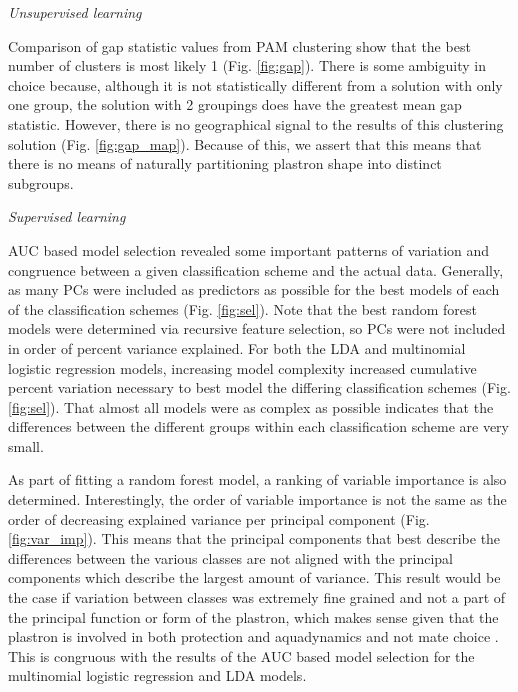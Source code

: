 \documentclass[12pt,letterpaper]{article}
\renewcommand{\subsection}[1]{%
\bigskip
\begin{center}
\begin{large}
\normalfont\itshape #1
\end{large}
\end{center}}
\begin{document}
\subsection{Unsupervised learning}
Comparison of gap statistic values from PAM clustering show that the best number of clusters is most likely 1 (Fig. \ref{fig:gap}). There is some ambiguity in choice because, although it is not statistically different from a solution with only one group, the solution with 2 groupings does have the greatest mean gap statistic. However, there is no geographical signal to the results of this clustering solution (Fig. \ref{fig:gap_map}). Because of this, we assert that this means that there is no means of naturally partitioning plastron shape into distinct subgroups.

\subsection{Supervised learning}
AUC based model selection revealed some important patterns of variation and congruence between a given classification scheme and the actual data. Generally, as many PCs were included as predictors as possible for the best models of each of the classification schemes (Fig. \ref{fig:sel}). Note that the best random forest models were determined via recursive feature selection, so PCs were not included in order of percent variance explained. For both the LDA and multinomial logistic regression models, increasing model complexity increased cumulative percent variation necessary to best model the differing classification schemes (Fig. \ref{fig:sel}). That almost all models were as complex as possible indicates that the differences between the different groups within each classification scheme are very small.

As part of fitting a random forest model, a ranking of variable importance is also determined. Interestingly, the order of variable importance is not the same as the order of decreasing explained variance per principal component (Fig. \ref{fig:var_imp}). This means that the principal components that best describe the differences between the various classes are not aligned with the principal components which describe the largest amount of variance. This result would be the case if variation between classes was extremely fine grained and not a part of the principal function or form of the plastron, which makes sense given that the plastron is involved in both protection and aquadynamics and not mate choice \citep{Germano2009,Holland1992,Lubcke2007,Rivera2008}. This is congruous with the results of the AUC based model selection for the multinomial logistic regression and LDA models.
\end{document}
